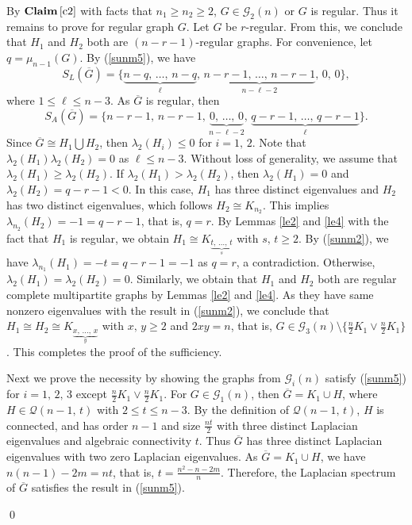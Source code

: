 \documentclass[12pt]{article}
\newenvironment{pf}{\medskip\noindent{Proof:  \hspace*{-.4cm}}
       \enspace}{\hfill \qed \newline \medskip}
\begin{document}
\begin{pf}
 \noindent
 By ${\bf Claim\,\ref{c2}}$ with facts that $n_1\geq n_2\geq 2$, $G\in \mathcal{G}_2(n)$ or $G$ is regular. Thus it remains to prove for regular graph $G$. Let $G$ be $r$-regular.
 From this, we conclude that $H_1$ and $H_2$ both are $(n-r-1)$-regular graphs. For convenience, let $q=\mu_{n-1}(G)$. By (\ref{sunm5}), we have
  $$ S_L(\overline{G})=\Bigg\{\underbrace{n-q,\,\ldots,\,n-q}_{\ell},\,\underbrace{n-r-1,\,\ldots,\,n-r-1}_{n-\ell-2},\,0,\,0\Bigg\},$$
  where $1\leq \ell\leq n-3$. As $\overline{G}$ is regular, then
  $$ S_A(\overline{G})=\Bigg\{n-r-1,\,n-r-1,\,\underbrace{0,\,\ldots,\,0}_{n-\ell-2},\,\underbrace{q-r-1,\,\ldots,\,q-r-1}_{\ell}\Bigg\}.$$
 Since $\overline{G}\cong H_1\bigcup H_2$, then $\lambda_2(H_i)\leq
 0$ for $i=1,\,2$. Note that $\lambda_2(H_1)\lambda_2(H_2)=0$ as $\ell\leq
 n-3$. Without loss of generality, we assume that $\lambda_2(H_1)\geq
 \lambda_2(H_2)$. If $\lambda_2(H_1)>\lambda_2(H_2)$, then
 $\lambda_2(H_1)=0$ and $\lambda_2(H_2)=q-r-1<0$. In this case, $H_1$ has three distinct eigenvalues
 and $H_2$  has two distinct eigenvalues, which follows $H_2\cong K_{n_2}$. This implies
 $\lambda_{n_2}(H_2)=-1=q-r-1$, that is, $q=r$.
 By Lemmas \ref{le2} and \ref{le4} with the fact that $H_1$ is regular, we obtain $H_1\cong
 K_{\underbrace{t,\,\ldots,\,t}_s}$ with $s,\,t\geq 2$. By
 (\ref{sunm2}), we have $\lambda_{n_1}(H_1)=-t=q-r-1=-1$ as $q=r$,
 a contradiction. Otherwise, $\lambda_2(H_1)=\lambda_2(H_2)=0$.
 Similarly, we obtain that $H_1$ and $H_2$ both are regular complete
 multipartite graphs by Lemmas \ref{le2} and \ref{le4}. As they have
 same nonzero eigenvalues with the result in (\ref{sunm2}), we
 conclude that $H_1\cong H_2\cong K_{\underbrace{x,\,\ldots,\,x}_y}$ with $x,\,y\geq
 2$ and $2xy=n$, that is, $G\in  \mathcal{G}_3(n)\setminus \{\frac{n}{2}K_1\vee \frac{n}{2}K_1\}$. This completes the proof of the sufficiency.

\vspace*{3mm}

\noindent
 Next we prove the necessity by showing the graphs from $\mathcal{G}_i(n)$ satisfy (\ref{sunm5}) for $i=1,\,2,\,3$ except $\frac{n}{2}K_1\vee \frac{n}{2}K_1$.
 For $G\in \mathcal{G}_1(n)$, then $\overline{G}=K_1\cup H$, where
 $H\in \mathcal{Q}(n-1,\,t)$ with $2\leq t\leq n-3$. By the
 definition of $\mathcal{Q}(n-1,\,t)$, $H$ is connected, and has order $n-1$ and size
 $\frac{nt}{2}$ with three distinct Laplacian eigenvalues and
 algebraic connectivity $t$. Thus $\overline{G}$ has three distinct
 Laplacian eigenvalues with two zero Laplacian eigenvalues.
 As $\overline{G}=K_1\cup H$, we have
 $n(n-1)-2m=nt$, that is, $t=\frac{n^2-n-2m}{n}$. Therefore, the Laplacian spectrum of
 $\overline{G}$ satisfies the result in (\ref{sunm5}).


\end{pf}
\end{document}
